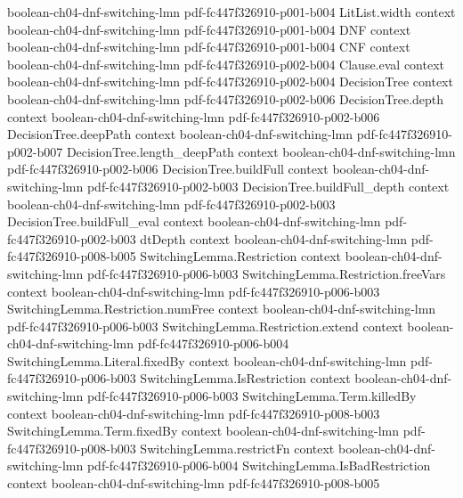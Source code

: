 \begin{lemma}
  {boolean-ch04-dnf-switching-lmn}
  {pdf-fc447f326910-p001-b004}
\proofstep
  {LitList.width}
  {context}
  {boolean-ch04-dnf-switching-lmn}
  {pdf-fc447f326910-p001-b004}
\proofstep
  {DNF}
  {context}
  {boolean-ch04-dnf-switching-lmn}
  {pdf-fc447f326910-p001-b004}
\proofstep
  {CNF}
  {context}
  {boolean-ch04-dnf-switching-lmn}
  {pdf-fc447f326910-p002-b004}
\proofstep
  {Clause.eval}
  {context}
  {boolean-ch04-dnf-switching-lmn}
  {pdf-fc447f326910-p002-b004}
\proofstep
  {DecisionTree}
  {context}
  {boolean-ch04-dnf-switching-lmn}
  {pdf-fc447f326910-p002-b006}
\proofstep
  {DecisionTree.depth}
  {context}
  {boolean-ch04-dnf-switching-lmn}
  {pdf-fc447f326910-p002-b006}
\proofstep
  {DecisionTree.deepPath}
  {context}
  {boolean-ch04-dnf-switching-lmn}
  {pdf-fc447f326910-p002-b007}
\proofstep
  {DecisionTree.length_deepPath}
  {context}
  {boolean-ch04-dnf-switching-lmn}
  {pdf-fc447f326910-p002-b006}
\proofstep
  {DecisionTree.buildFull}
  {context}
  {boolean-ch04-dnf-switching-lmn}
  {pdf-fc447f326910-p002-b003}
\proofstep
  {DecisionTree.buildFull_depth}
  {context}
  {boolean-ch04-dnf-switching-lmn}
  {pdf-fc447f326910-p002-b003}
\proofstep
  {DecisionTree.buildFull_eval}
  {context}
  {boolean-ch04-dnf-switching-lmn}
  {pdf-fc447f326910-p002-b003}
\proofstep
  {dtDepth}
  {context}
  {boolean-ch04-dnf-switching-lmn}
  {pdf-fc447f326910-p008-b005}
\proofstep
  {SwitchingLemma.Restriction}
  {context}
  {boolean-ch04-dnf-switching-lmn}
  {pdf-fc447f326910-p006-b003}
\proofstep
  {SwitchingLemma.Restriction.freeVars}
  {context}
  {boolean-ch04-dnf-switching-lmn}
  {pdf-fc447f326910-p006-b003}
\proofstep
  {SwitchingLemma.Restriction.numFree}
  {context}
  {boolean-ch04-dnf-switching-lmn}
  {pdf-fc447f326910-p006-b003}
\proofstep
  {SwitchingLemma.Restriction.extend}
  {context}
  {boolean-ch04-dnf-switching-lmn}
  {pdf-fc447f326910-p006-b004}
\proofstep
  {SwitchingLemma.Literal.fixedBy}
  {context}
  {boolean-ch04-dnf-switching-lmn}
  {pdf-fc447f326910-p006-b003}
\proofstep
  {SwitchingLemma.IsRestriction}
  {context}
  {boolean-ch04-dnf-switching-lmn}
  {pdf-fc447f326910-p006-b003}
\proofstep
  {SwitchingLemma.Term.killedBy}
  {context}
  {boolean-ch04-dnf-switching-lmn}
  {pdf-fc447f326910-p008-b003}
\proofstep
  {SwitchingLemma.Term.fixedBy}
  {context}
  {boolean-ch04-dnf-switching-lmn}
  {pdf-fc447f326910-p008-b003}
\proofstep
  {SwitchingLemma.restrictFn}
  {context}
  {boolean-ch04-dnf-switching-lmn}
  {pdf-fc447f326910-p006-b004}
\proofstep
  {SwitchingLemma.IsBadRestriction}
  {context}
  {boolean-ch04-dnf-switching-lmn}
  {pdf-fc447f326910-p008-b005}

\end{lemma}
